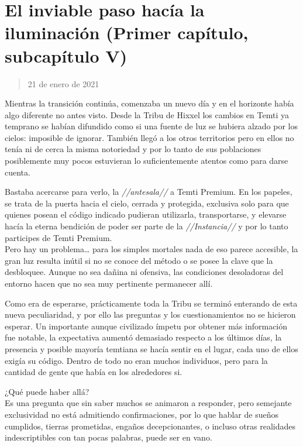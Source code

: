 \documentclass[
  spanish,
]{book}
\begin{document}
\hypertarget{el-inviable-paso-hacuxeda-la-iluminaciuxf3n-primer-capuxedtulo-subcapuxedtulo-v}{%
\section{El inviable paso hacía la iluminación (Primer capítulo, subcapítulo V)}\label{el-inviable-paso-hacuxeda-la-iluminaciuxf3n-primer-capuxedtulo-subcapuxedtulo-v}}

\begin{quote}
21 de enero de 2021
\end{quote}

Mientras la transición continúa, comenzaba un nuevo día y en el horizonte había algo diferente no antes visto. Desde la Tribu de Hixxel los cambios en Temti ya temprano se habían difundido como si una fuente de luz se hubiera alzado por los cielos: imposible de ignorar. También llegó a los otros territorios pero en ellos no tenía ni de cerca la misma notoriedad y por lo tanto de sus poblaciones posiblemente muy pocos estuvieran lo suficientemente atentos como para darse cuenta.

Bastaba acercarse para verlo, la \emph{//antesala//} a Temti Premium. En los papeles, se trata de la puerta hacia el cielo, cerrada y protegida, exclusiva solo para que quienes posean el código indicado pudieran utilizarla, transportarse, y elevarse hacía la eterna bendición de poder ser parte de la \emph{//Instancia//} y por lo tanto participes de Temti Premium.\\
Pero hay un problema\ldots{} para los simples mortales nada de eso parece accesible, la gran luz resulta inútil si no se conoce del método o se posee la clave que la desbloquee. Aunque no sea dañina ni ofensiva, las condiciones desoladoras del entorno hacen que no sea muy pertinente permanecer allí.

Como era de esperarse, prácticamente toda la Tribu se terminó enterando de esta nueva peculiaridad, y por ello las preguntas y los cuestionamientos no se hicieron esperar. Un importante aunque civilizado ímpetu por obtener más información fue notable, la expectativa aumentó demasiado respecto a los últimos días, la presencia y posible mayoría temtiana se hacía sentir en el lugar, cada uno de ellos exigía su código. Dentro de todo no eran muchos individuos, pero para la cantidad de gente que había en los alrededores si.

¿Qué puede haber allá?\\
Es una pregunta que sin saber muchos se animaron a responder, pero semejante exclusividad no está admitiendo confirmaciones, por lo que hablar de sueños cumplidos, tierras prometidas, engaños decepcionantes, o incluso otras realidades indescriptibles con tan pocas palabras, puede ser en vano.
\end{document}
